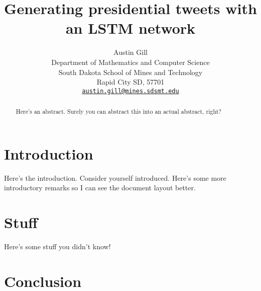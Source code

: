 \documentclass[letterpaper]{article}
\title{Generating presidential tweets with an LSTM network}
\author{%
    Austin Gill\\
    Department of Mathematics and Computer Science\\
    South Dakota School of Mines and Technology\\
    Rapid City SD, 57701\\
    \texttt{\href{mailto:austin.gill@mines.sdsmt.edu}{austin.gill@mines.sdsmt.edu}} \\
}
\begin{document}
\maketitle

\begin{abstract}
    Here's an abstract. Surely you can abstract this into an actual abstract, right?
\end{abstract}

\section{Introduction}
    Here's the introduction. Consider yourself introduced. Here's some more introductory remarks so I can see the document layout better.


\section{Stuff}
    Here's some stuff you didn't know!

\section{Conclusion}
\end{document}
